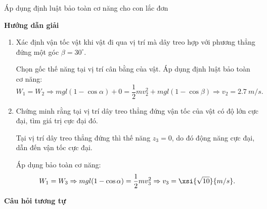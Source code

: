 \begin{dang}{Áp dụng định luật bảo toàn cơ năng cho con lắc đơn}
{	}
	{\begin{center}
			\textbf{Hướng dẫn giải}
		\end{center}
		
		\begin{enumerate}[label=\alph*)]
			\item Xác định vận tốc vật khi vật đi qua vị trí mà dây treo hợp với phương thẳng đứng một góc $\beta = 30^\circ$.
			
			Chọn gốc thế năng tại vị trí cân bằng của vật. Áp dụng định luật bảo toàn cơ năng:
			$$W_1 = W_2 \Rightarrow mgl(1-\cos \alpha) + 0 = \dfrac{1}{2} mv_2^2 + mgl (1-\cos \beta) \Rightarrow v_2 = \SI{2.7}{m/s}.$$
			
			\item Chứng minh rằng tại vị trí dây treo thẳng đứng vận tốc của vật có độ lớn cực đại, tìm giá trị cực đại đó.
			
			Tại vị trí dây treo thẳng đứng thì thế năng $z_3=0$, do đó động năng cực đại, dẫn đến vận tốc cực đại.
			
			Áp dụng bảo toàn cơ năng:
			$$W_1 = W_3 \Rightarrow mgl(1-\cos \alpha) = \dfrac{1}{2}mv_3^2 \Rightarrow v_3 = \xsi{\sqrt{10}}{m/s}.$$
		\end{enumerate}
		
		\begin{center}
			\textbf{Câu hỏi tương tự}
		\end{center}
		
}
\end{dang}
